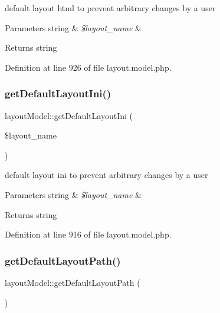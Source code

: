default layout html to prevent arbitrary changes by a user 
\begin{DoxyParams}[1]{Parameters}
string & {\em \$layout\+\_\+name} & \\
\hline
\end{DoxyParams}
\begin{DoxyReturn}{Returns}
string 
\end{DoxyReturn}


Definition at line 926 of file layout.\+model.\+php.

\hypertarget{classlayoutModel_a983d5b4ff865d15ee237385b1c82b5e5}{}\label{classlayoutModel_a983d5b4ff865d15ee237385b1c82b5e5} 
\subsubsection{\texorpdfstring{get\+Default\+Layout\+Ini()}{getDefaultLayoutIni()}}
{\footnotesize\ttfamily layout\+Model\+::get\+Default\+Layout\+Ini (\begin{DoxyParamCaption}\item[{}]{\$layout\+\_\+name }\end{DoxyParamCaption})}

default layout ini to prevent arbitrary changes by a user 
\begin{DoxyParams}[1]{Parameters}
string & {\em \$layout\+\_\+name} & \\
\hline
\end{DoxyParams}
\begin{DoxyReturn}{Returns}
string 
\end{DoxyReturn}


Definition at line 916 of file layout.\+model.\+php.

\hypertarget{classlayoutModel_a446c397aaf30fa592cba675f2fbb9495}{}\label{classlayoutModel_a446c397aaf30fa592cba675f2fbb9495} 
\subsubsection{\texorpdfstring{get\+Default\+Layout\+Path()}{getDefaultLayoutPath()}}
{\footnotesize\ttfamily layout\+Model\+::get\+Default\+Layout\+Path (\begin{DoxyParamCaption}{ }\end{DoxyParamCaption})}

